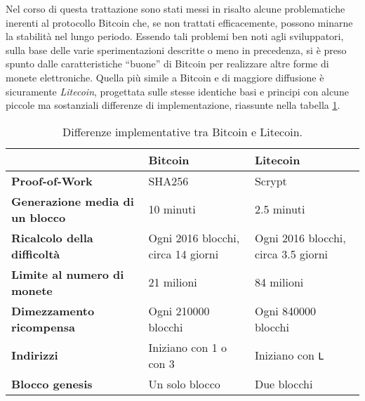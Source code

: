 Nel corso di questa trattazione sono stati messi in risalto alcune problematiche inerenti al protocollo Bitcoin che, se non trattati efficacemente, possono minarne la stabilità nel lungo periodo.
Essendo tali problemi ben noti agli sviluppatori, sulla base delle varie sperimentazioni descritte o meno in precedenza, si è preso spunto dalle caratteristiche ``buone'' di Bitcoin per realizzare altre forme di monete elettroniche.
Quella più simile a Bitcoin e di maggiore diffusione è sicuramente \emph{Litecoin}, progettata sulle stesse identiche basi e principi con alcune piccole ma sostanziali differenze di implementazione, riassunte nella tabella \ref{table_bit_lite_diff}.

\begin{table}
  \centering
  \begin{tabular}{m{} | m{} | m{} |}
    \textbf{} & \textbf{Bitcoin} & \textbf{Litecoin} \\ \hline
    \textbf{Proof-of-Work} & SHA256 & Scrypt \\ \hline
    \textbf{Generazione media di un blocco} & 10 minuti & 2.5 minuti \\ \hline
    \textbf{Ricalcolo della difficoltà} & Ogni 2016 blocchi, circa 14 giorni & Ogni 2016 blocchi, circa 3.5 giorni \\ \hline
    \textbf{Limite al numero di monete} & 21 milioni & 84 milioni \\ \hline
    \textbf{Dimezzamento ricompensa} & Ogni 210000 blocchi & Ogni 840000 blocchi \\ \hline
    \textbf{Indirizzi} & Iniziano con 1 o con 3 & Iniziano con \verb|L| \\ \hline
    \textbf{Blocco genesis} & Un solo blocco & Due blocchi \\ \hline
  \end{tabular}
  \caption{Differenze implementative tra Bitcoin e Litecoin.\label{table_bit_lite_diff}}
\end{table}

